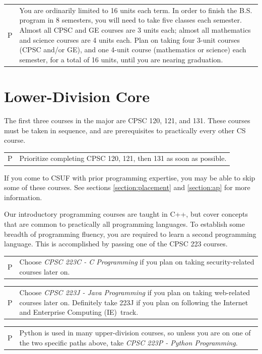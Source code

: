 \documentclass{book}
\newenvironment{tip}{
  \tcolorbox \begin{tabular}{m{.5in} m{5in}} \Large{P} &
}{
  \end{tabular} \endtcolorbox
}
\newcommand{\IeTrackName}{Internet and Enterprise Computing (IE)}
\begin{document}
\begin{tip} \index{unit limit}
  You are ordinarily limited to 16 units each term. In order to finish the B.S. program in 8 semesters, you will need to take five classes each semester. Almost all CPSC and GE courses are 3 units each; almost all mathematics and science courses are 4 units each. Plan on taking four 3-unit courses (CPSC and/or GE), and one 4-unit course (mathematics or science) each semester, for a total of 16 units, until you are nearing graduation.
\end{tip}

\section{Lower-Division Core}
The first three courses in the major are CPSC 120, 121, and 131. These courses must be taken in sequence, and are prerequisites to practically every other CS course.

\begin{tip}
  Prioritize completing CPSC 120, 121, then 131 as soon as possible.
\end{tip}

If you come to CSUF with prior programming expertise, you may be able to skip some of these courses. See sections \ref{section:placement} and \ref{section:ap} for more information.

Our introductory programming courses are taught in C++, but cover concepts that are common to practically all programming languages. To establish some breadth of programming fluency, you are required to learn a second programming language. This is accomplished by passing one of the CPSC 223 courses.

\begin{tip}
Choose \emph{CPSC 223C - C Programming} if you plan on taking security-related courses later on.
\end{tip}

\begin{tip}
Choose \emph{CPSC 223J - Java Programming} if you plan on taking web-related courses later on. Definitely take 223J if you plan on following the \IeTrackName~track\IeTrackIndex.
\end{tip}

\begin{tip}
  Python is used in many upper-division courses, so unless you are on one of the two specific paths above, take \emph{CPSC 223P - Python Programming}.
\end{tip}
\end{document}
